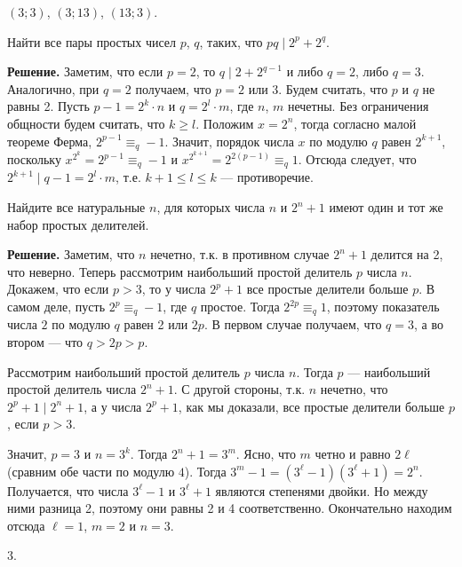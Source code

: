  $(3;3)$, $(3;13)$, $(13;3)$.

 Найти все пары простых чисел $p$, $q$, таких, что $pq \mid
2^p+2^q$.

\textbf{Решение.} Заметим, что если $p=2$, то $q\mid 2 + 2^{q-1}$ и либо $q=2$,
либо $q=3$. Аналогично, при $q=2$ получаем, что $p=2$ или 3. Будем
считать, что $p$ и $q$ не равны 2. Пусть $p-1=2^k\cdot n$ и
$q=2^l\cdot m$, где $n$, $m$ нечетны. Без ограничения общности будем
считать, что $k\geqslant l$. Положим $x=2^n$, тогда согласно малой
теореме Ферма, $2^{p-1}\equiv_q -1$. Значит, порядок числа
$x$ по модулю $q$ равен $2^{k+1}$, поскольку $x^{2^k}=2^{p-1}\equiv_q
-1$ и $x^{2^{k+1}}=2^{2(p-1)}\equiv_q 1$. Отсюда
следует, что $2^{k+1}\mid q-1 = 2^l\cdot m$, т.е. $k+1\leqslant
l\leqslant k$ --- противоречие.

 Найдите все натуральные $n$, для которых числа
$n$ и $2^n + 1$ имеют один и тот же набор простых делителей.

\textbf{Решение.} Заметим, что $n$ нечетно, т.к. в противном случае $2^n+1$ делится на 2, что неверно. Теперь рассмотрим наибольший простой делитель $p$ числа $n$. Докажем, что если $p>3$, то у числа
$2^p+1$ все простые делители больше $p$. В самом деле, пусть
$2^p\equiv_q -1$, где $q$ простое. Тогда $2^{2p}\equiv_q 1$, поэтому показатель числа $2$ по модулю $q$ равен 2 или $2p$. В первом случае получаем, что $q=3$, а во втором --- что $q> 2p>p$.

Рассмотрим наибольший простой делитель $p$ числа $n$. Тогда $p$ --- наибольший простой делитель числа $2^n+1$. С другой стороны, т.к. $n$ нечетно, что $2^p+1\mid 2^n+1$, а у числа $2^p+1$, как мы доказали, все простые делители больше $p$, если $p>3$. 

Значит, $p=3$ и $n=3^k$. Тогда $2^{n}+1 = 3^m$. Ясно, что $m$ четно и равно $2\ell$ (сравним обе части по модулю $4$). Тогда $3^m-1=(3^\ell-1)(3^\ell+1)=2^n$. Получается, что числа $3^\ell-1$ и $3^\ell+1$ являются степенями двойки. Но между ними разница 2, поэтому они равны 2 и 4 соответственно. Окончательно находим отсюда $\ell=1$, $m=2$ и $n=3$.

 3.

